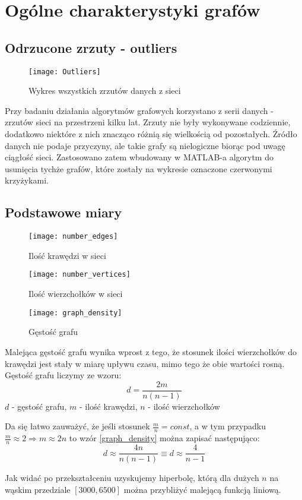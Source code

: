 \FloatBarrier
\section{Ogólne charakterystyki grafów}
\subsection{Odrzucone zrzuty - outliers}
\begin{figure}[h]
	\centering
	\texttt{[image: Outliers]}
	\caption{Wykres wszystkich zrzutów danych z sieci}
\end{figure}
Przy badaniu działania algorytmów grafowych korzystano z serii danych - zrzutów sieci na przestrzeni kilku lat. Zrzuty nie były wykonywane codziennie, dodatkowo niektóre z nich znacząco różnią się wielkością od pozostałych. Źródło danych nie podaje przyczyny, ale takie grafy są nielogiczne biorąc pod uwagę ciągłość sieci. Zastosowano zatem wbudowany w MATLAB-a algorytm do usunięcia tychże grafów, które zostały na wykresie oznaczone czerwonymi krzyżykami.
\FloatBarrier
\subsection{Podstawowe miary}
\begin{figure}[h]
	\centering
	\texttt{[image: number\_edges]}
	\caption{Ilość krawędzi w sieci}
\end{figure}
\FloatBarrier
\FloatBarrier
\begin{figure}[h]
	\centering
	\texttt{[image: number\_vertices]}
	\caption{Ilość wierzchołków w sieci}
\end{figure}
\FloatBarrier
\FloatBarrier
\begin{figure}[h]
	\centering
	\texttt{[image: graph\_density]}
	\caption{Gęstość grafu}
\end{figure}
\FloatBarrier
Malejąca gęstość grafu wynika wprost z tego, że stosunek ilości wierzchołków do krawędzi jest stały w miarę upływu czasu, mimo tego że obie wartości rosną. Gęstość grafu liczymy ze wzoru:
\begin{equation}
\label{graph_density}
d=\frac{2m}{n(n-1)}
\end{equation}
$d$ - gęstość grafu, 
$m$ - ilość krawędzi, 
$n$ - ilość wierzchołków

Da się łatwo zauważyć, że jeśli stosunek $\frac{m}{n} = const$, a w tym przypadku $\frac{m}{n} \approx 2 \Rightarrow m \approx 2n$ to wzór \ref{graph_density} można zapisać następująco:
\begin{equation}
\label{graph_density_simplified}
d \approx \frac{4n}{n(n-1)} \equiv d \approx \frac{4}{n-1}
\end{equation}

Jak widać po przekształceniu uzyskujemy hiperbolę, którą dla dużych $n$ na wąskim przedziale $[3000, 6500]$ można przybliżyć malejącą funkcją liniową.
\FloatBarrier
\newpage